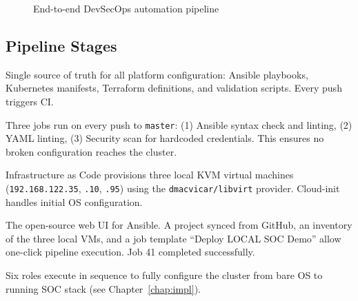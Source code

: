 \documentclass[12pt,a4paper]{report}
\begin{document}
\begin{figure}[H]
\centering
{}
\caption{End-to-end DevSecOps automation pipeline}
\label{fig:pipeline}
\end{figure}

\subsection{Pipeline Stages}

\begin{description}[leftmargin=2cm]
  \item[GitHub] Single source of truth for all platform configuration: Ansible playbooks, Kubernetes manifests, Terraform definitions, and validation scripts. Every push triggers CI.
  \item[GitHub Actions] Three jobs run on every push to \texttt{master}: (1) Ansible syntax check and linting, (2) YAML linting, (3) Security scan for hardcoded credentials. This ensures no broken configuration reaches the cluster.
  \item[Terraform + KVM/libvirt] Infrastructure as Code provisions three local KVM virtual machines (\texttt{192.168.122.35}, \texttt{.10}, \texttt{.95}) using the \texttt{dmacvicar/libvirt} provider. Cloud-init handles initial OS configuration.
  \item[AWX (Ansible Tower)] The open-source web UI for Ansible. A project synced from GitHub, an inventory of the three local VMs, and a job template ``Deploy LOCAL SOC Demo'' allow one-click pipeline execution. Job 41 completed successfully.
  \item[Ansible] Six roles execute in sequence to fully configure the cluster from bare OS to running SOC stack (see Chapter~\ref{chap:impl}).
\end{description}
\end{document}
